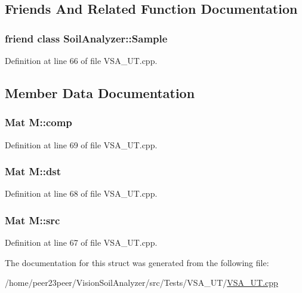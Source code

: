 \subsection{Friends And Related Function Documentation}
\hypertarget{struct_m_a83d1981518b48903f64d0e6333f5a0c0}{}
\subsubsection[{Soil\+Analyzer\+::\+Sample}]{\setlength{\rightskip}{0pt plus 5cm}friend class {\bf Soil\+Analyzer\+::\+Sample}\hspace{0.3cm}{\ttfamily [friend]}}\label{struct_m_a83d1981518b48903f64d0e6333f5a0c0}


Definition at line 66 of file V\+S\+A\+\_\+\+U\+T.\+cpp.



\subsection{Member Data Documentation}
\hypertarget{struct_m_aea135e95a654e5a8fff759cd5c104405}{}
\subsubsection[{comp}]{\setlength{\rightskip}{0pt plus 5cm}Mat M\+::comp}\label{struct_m_aea135e95a654e5a8fff759cd5c104405}


Definition at line 69 of file V\+S\+A\+\_\+\+U\+T.\+cpp.

\hypertarget{struct_m_a08a6e094da4841420fd9489705ecb7a3}{}
\subsubsection[{dst}]{\setlength{\rightskip}{0pt plus 5cm}Mat M\+::dst}\label{struct_m_a08a6e094da4841420fd9489705ecb7a3}


Definition at line 68 of file V\+S\+A\+\_\+\+U\+T.\+cpp.

\hypertarget{struct_m_ae37eecb837e8d52a27330268e4b12a34}{}
\subsubsection[{src}]{\setlength{\rightskip}{0pt plus 5cm}Mat M\+::src}\label{struct_m_ae37eecb837e8d52a27330268e4b12a34}


Definition at line 67 of file V\+S\+A\+\_\+\+U\+T.\+cpp.



The documentation for this struct was generated from the following file\+:\begin{DoxyCompactItemize}
\item 
/home/peer23peer/\+Vision\+Soil\+Analyzer/src/\+Tests/\+V\+S\+A\+\_\+\+U\+T/\hyperlink{_v_s_a___u_t_8cpp}{V\+S\+A\+\_\+\+U\+T.\+cpp}\end{DoxyCompactItemize}
